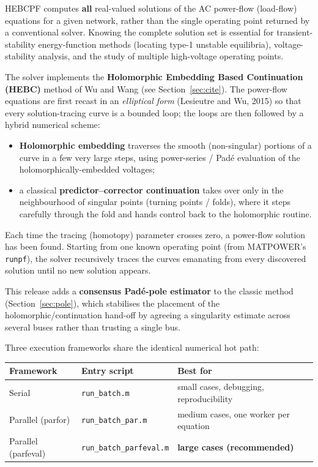 \documentclass[11pt,a4paper]{article}
\newcommand{\code}[1]{\texttt{#1}}
\begin{document}
HEBCPF computes \textbf{all} real-valued solutions of the AC power-flow (load-flow)
equations for a given network, rather than the single operating point returned by a
conventional solver. Knowing the complete solution set is essential for
transient-stability energy-function methods (locating type-1 unstable equilibria),
voltage-stability analysis, and the study of multiple high-voltage operating points.

The solver implements the \textbf{Holomorphic Embedding Based Continuation (HEBC)}
method of Wu and Wang (see Section~\ref{sec:cite}). The power-flow equations are first
recast in an \emph{elliptical form} (Lesieutre and Wu, 2015) so that every
solution-tracing curve is a
bounded loop; the loops are then followed by a hybrid numerical scheme:

\begin{itemize}[leftmargin=1.4em]
  \item \textbf{Holomorphic embedding} traverses the smooth (non-singular) portions of
        a curve in a few very large steps, using power-series / Pad\'e evaluation of the
        holomorphically-embedded voltages;
  \item a classical \textbf{predictor--corrector continuation} takes over only in the
        neighbourhood of singular points (turning points / folds), where it steps
        carefully through the fold and hands control back to the holomorphic routine.
\end{itemize}

Each time the tracing (homotopy) parameter crosses zero, a power-flow solution has been
found. Starting from one known operating point (from MATPOWER's \code{runpf}), the solver
recursively traces the curves emanating from every discovered solution until no new
solution appears.

This release adds a \textbf{consensus Pad\'e-pole estimator} to the classic method
(Section~\ref{sec:pole}), which stabilises the placement of the holomorphic/continuation
hand-off by agreeing a singularity estimate across several buses rather than trusting a
single bus.

Three execution frameworks share the identical numerical hot path:

\begin{center}
\begin{tabular}{@{}lll@{}}
\toprule
Framework & Entry script & Best for\\
\midrule
Serial            & \code{run_batch.m}          & small cases, debugging, reproducibility\\
Parallel (parfor) & \code{run_batch_par.m}      & medium cases, one worker per equation\\
Parallel (parfeval)& \code{run_batch_parfeval.m} & \textbf{large cases (recommended)}\\
\bottomrule
\end{tabular}
\end{center}
\end{document}
